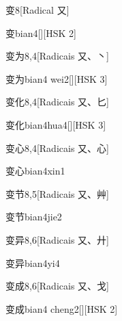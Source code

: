 \begin{entry}{变}{8}[Radical ⼜]
  \begin{phonetics}{变}{bian4}[][HSK 2]
  \end{phonetics}
\end{entry}

\begin{entry}{变为}{8,4}[Radicais ⼜、⼂]
  \begin{phonetics}{变为}{bian4 wei2}[][HSK 3]
  \end{phonetics}
\end{entry}

\begin{entry}{变化}{8,4}[Radicais ⼜、⼔]
  \begin{phonetics}{变化}{bian4hua4}[][HSK 3]
  \end{phonetics}
\end{entry}

\begin{entry}{变心}{8,4}[Radicais ⼜、⼼]
  \begin{phonetics}{变心}{bian4xin1}
  \end{phonetics}
\end{entry}

\begin{entry}{变节}{8,5}[Radicais ⼜、⾋]
  \begin{phonetics}{变节}{bian4jie2}
  \end{phonetics}
\end{entry}

\begin{entry}{变异}{8,6}[Radicais ⼜、⼶]
  \begin{phonetics}{变异}{bian4yi4}
  \end{phonetics}
\end{entry}

\begin{entry}{变成}{8,6}[Radicais ⼜、⼽]
  \begin{phonetics}{变成}{bian4 cheng2}[][HSK 2]
  \end{phonetics}
\end{entry}

